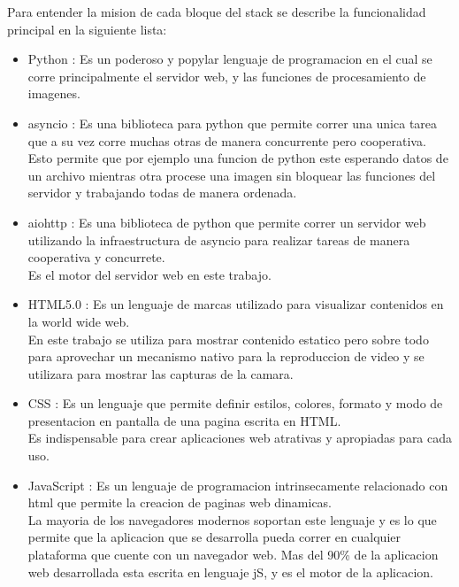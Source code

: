    Para entender la mision de cada bloque del stack se  describe la funcionalidad principal en la siguiente lista:
   \begin{itemize}
      \item{Python \citep{WEBSITE:python}: Es un poderoso y popylar lenguaje de programacion en el cual se corre principalmente el servidor web, y las funciones de procesamiento de imagenes.
      }
      \item{asyncio \citep{WEBSITE:asyncio}: Es una biblioteca para python que permite correr una unica tarea que a su vez corre muchas otras de manera concurrente pero cooperativa. \\
      Esto permite que por ejemplo una funcion de python este esperando datos de un archivo mientras otra procese una imagen sin bloquear las funciones del servidor y trabajando todas de manera ordenada.
      }
      \item{aiohttp \citep{WEBSITE:aiohttp}: Es una biblioteca de python que permite correr un servidor web utilizando la infraestructura de asyncio para realizar tareas de manera cooperativa y concurrete.\\
      Es el motor del servidor web en este trabajo.
      }
      \item{HTML5.0 \citep{WEBSITE:html5}: Es un lenguaje de marcas utilizado para visualizar contenidos en la world wide web.\\
         En este trabajo se utiliza para mostrar contenido estatico pero sobre todo para aprovechar un mecanismo nativo para la reproduccion de video y se utilizara para mostrar las capturas de la camara. \\
      }
      \item{CSS \citep{WEBSITE:css}: Es un lenguaje que permite definir estilos, colores, formato y modo de presentacion en pantalla de una pagina escrita en HTML.\\
      Es indispensable para crear aplicaciones web atrativas y apropiadas para cada uso.
      }
      \item{JavaScript \citep{WEBSITE:javascript}: Es un lenguaje de programacion intrinsecamente relacionado con html que permite la creacion de paginas web dinamicas.\\
         La mayoria de los navegadores modernos soportan este lenguaje y es lo que permite que la aplicacion que se desarrolla pueda correr en cualquier plataforma que cuente con un navegador web.
         Mas del 90\% de la aplicacion web desarrollada esta escrita en lenguaje jS, y es el motor de la aplicacion. \\
}
\end{itemize}
